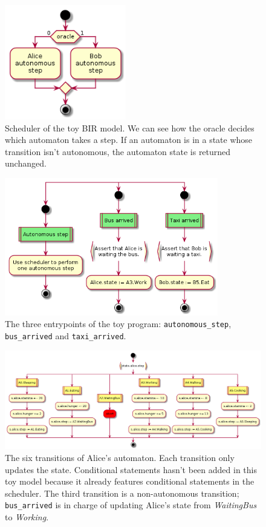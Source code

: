 \documentclass{kththesis}
\begin{document}
{\begin{figure}[p]
	\includegraphics[height=5cm]{figures/alice-bob-sheduler-oracle.png}
	\centering
	\caption{Scheduler of the toy BIR model. We can see how the oracle decides which automaton takes a step. If an automaton is in a state whose transition isn't autonomous, the automaton state is returned unchanged.}
	\label{alice-bob-sheduler-oracle}
\end{figure}

\begin{figure}[p]
	\includegraphics[height=6cm]{figures/alice-bob-entrypoints.png}
	\centering
	\caption{The three entrypoints of the toy program: \texttt{autonomous\_step}, \texttt{bus\_arrived} and \texttt{taxi\_arrived}.}
	\label{alice-bob-entrypoints}
\end{figure}

\begin{figure}[p]
	\includegraphics[width=\textwidth]{figures/alice-bob-alice_autonomous_transitions.png}
	\centering
	\caption{The six transitions of Alice's automaton. Each transition only updates the state. Conditional statements hasn't been added in this toy model because it already features conditional statements in the scheduler. The third transition is a non-autonomous transition; \texttt{bus\_arrived} is in charge of updating Alice's state from \textit{WaitingBus} to \textit{Working}.}
	\label{alice-bob-alice_autonomous_transitions}
\end{figure}

}
\end{document}
